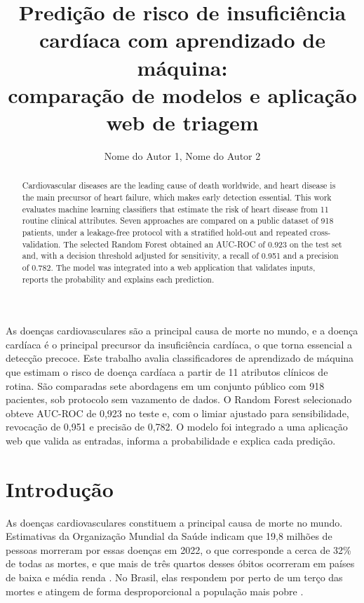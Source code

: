 \documentclass[12pt]{article}
\title{Predição de risco de insuficiência cardíaca com aprendizado de máquina:\\
comparação de modelos e aplicação web de triagem}
\author{Nome do Autor 1\inst{1}, Nome do Autor 2\inst{1}}
\begin{document}
\maketitle

\begin{abstract}
  Cardiovascular diseases are the leading cause of death worldwide, and heart
  disease is the main precursor of heart failure, which makes early detection
  essential. This work evaluates machine learning classifiers that estimate the
  risk of heart disease from 11 routine clinical attributes. Seven approaches
  are compared on a public dataset of 918 patients, under a leakage-free
  protocol with a stratified hold-out and repeated cross-validation. The
  selected Random Forest obtained an AUC-ROC of 0.923 on the test set and, with
  a decision threshold adjusted for sensitivity, a recall of 0.951 and a
  precision of 0.782. The model was integrated into a web application that
  validates inputs, reports the probability and explains each prediction.
\end{abstract}

\begin{resumo}
  As doenças cardiovasculares são a principal causa de morte no mundo, e a
  doença cardíaca é o principal precursor da insuficiência cardíaca, o que
  torna essencial a detecção precoce. Este trabalho avalia classificadores de
  aprendizado de máquina que estimam o risco de doença cardíaca a partir de 11
  atributos clínicos de rotina. São comparadas sete abordagens em um conjunto
  público com 918 pacientes, sob protocolo sem vazamento de dados. O Random
  Forest selecionado obteve AUC-ROC de 0,923 no teste e, com o limiar ajustado
  para sensibilidade, revocação de 0,951 e precisão de 0,782. O modelo foi
  integrado a uma aplicação web que valida as entradas, informa a
  probabilidade e explica cada predição.
\end{resumo}

\section{Introdução}
\label{sec:introducao}

As doenças cardiovasculares constituem a principal causa de morte no mundo.
Estimativas da Organização Mundial da Saúde indicam que 19,8 milhões de pessoas
morreram por essas doenças em 2022, o que corresponde a cerca de 32\% de todas
as mortes, e que mais de três quartos desses óbitos ocorreram em países de
baixa e média renda \cite{who:25}. No Brasil, elas respondem por perto de um
terço das mortes e atingem de forma desproporcional a população mais pobre
\cite{oliveira:24}.
\end{document}
